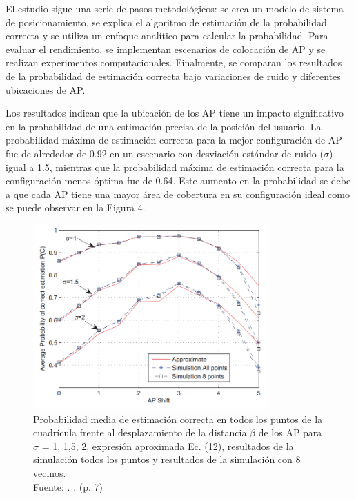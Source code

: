 El estudio sigue una serie de pasos metodológicos: se crea un modelo de sistema de posicionamiento, se explica el algoritmo de estimación de la probabilidad correcta y se utiliza un enfoque analítico para calcular la probabilidad. Para evaluar el rendimiento, se implementan escenarios de colocación de AP y se realizan experimentos computacionales. Finalmente, se comparan los resultados de la probabilidad de estimación correcta bajo variaciones de ruido y diferentes ubicaciones de AP.

Los resultados indican que la ubicación de los AP tiene un impacto significativo en la probabilidad de una estimación precisa de la posición del usuario. La probabilidad máxima de estimación correcta para la mejor configuración de AP fue de alrededor de 0.92 en un escenario con desviación estándar de ruido ($\sigma$) igual a 1.5, mientras que la probabilidad máxima de estimación correcta para la configuración menos óptima fue de 0.64. Este aumento en la probabilidad se debe a que cada AP tiene una mayor área de cobertura en su configuración ideal como se puede observar en la Figura 4.

\begin{figure}[!ht]
	\begin{center}
		\includegraphics[width=0.80\textwidth]{2/figures/ahmed2019.png}
		\caption[Probabilidad media de estimación correcta en todos los puntos de la cuadrícula frente al desplazamiento de la distancia $\beta$ de los AP para $\sigma$ = {1, 1,5, 2}, expresión aproximada Ec. (12), resultados de la simulación todos los puntos y resultados de la simulación con 8 vecinos.]{Probabilidad media de estimación correcta en todos los puntos de la cuadrícula frente al desplazamiento de la distancia $\beta$ de los AP para $\sigma$ = {1, 1,5, 2}, expresión aproximada Ec. (12), resultados de la simulación todos los puntos y resultados de la simulación con 8 vecinos.\\
			Fuente: \cite{pr_ahmed2019impactaps}. . (p. 7)}
		\label{2:fig112}
	\end{center}
\end{figure}

